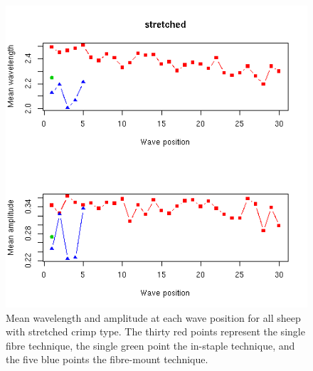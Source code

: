 %

\begin{figure}[!h]
  \centering
  \includegraphics[width=1.0\textwidth]{figstretch.png}
  \caption{Mean wavelength and amplitude at each wave position for all sheep with stretched crimp type. The thirty red points represent the single fibre technique, the single green point the in-staple technique, and the five blue points the fibre-mount technique.}
  \label{fig:stretch}
\end{figure}

%

